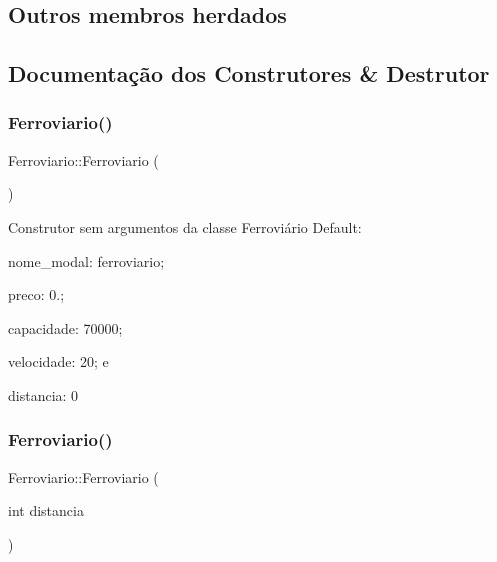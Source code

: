 \subsection*{Outros membros herdados}


\subsection{Documentação dos Construtores \& Destrutor}
\mbox{\label{classFerroviario_ad9ab87f65b1e904a3fec909076f0a993}} 
\subsubsection{\texorpdfstring{Ferroviario()}{Ferroviario()}\hspace{0.1cm}{\footnotesize\ttfamily [1/2]}}
{\footnotesize\ttfamily Ferroviario\+::\+Ferroviario (\begin{DoxyParamCaption}{ }\end{DoxyParamCaption})}

Construtor sem argumentos da classe Ferroviário Default\+:
\begin{DoxyItemize}
\item nome\+\_\+modal\+: ferroviario;
\item preco\+: 0.;
\item capacidade\+: 70000;
\item velocidade\+: 20; e
\item distancia\+: 0~\newline

\end{DoxyItemize}\mbox{\label{classFerroviario_a497cd242a790babb459821c59ff3678c}} 
\subsubsection{\texorpdfstring{Ferroviario()}{Ferroviario()}\hspace{0.1cm}{\footnotesize\ttfamily [2/2]}}
{\footnotesize\ttfamily Ferroviario\+::\+Ferroviario (\begin{DoxyParamCaption}\item[{int}]{distancia }\end{DoxyParamCaption})}

